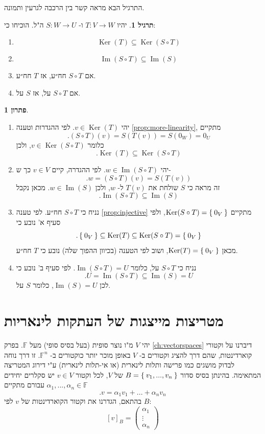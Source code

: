 \documentclass[12pt]{report}
\theoremstyle{plain}
\theoremstyle{definition}
\newtheorem{exercise}{תרגיל}[chapter]
\newtheorem*{solution}{פתרון}
\newcommand{\F}{\mathbb{F}}
\newcommand{\0}{\mathbf{0}}
\DeclareMathOperator{\Ker}{Ker}
\DeclareMathOperator{\Image}{Im}
\begin{document}
התרגיל הבא מראה קשר בין הרכבה לגרעין ותמונה.

\begin{exercise}\label{exer:composition}
יהיו
$T:V\to W$
ו-
$S:W\to U$
ה"ל. הוכיחו כי:
\begin{enumerate}[label=\alph*.]
\item 
$$
\Ker(T)\subseteq \Ker(S\circ T)
$$


\item 
$$
\Image(S\circ T)\subseteq \Image(S)
$$


\item 
אם
$S\circ T$
חח״ע, אז
$T$
חח״ע.


\item 
אם
$S\circ T$
על, אז 
$S$
על.


\end{enumerate}
\end{exercise}

\begin{solution}\
\begin{enumerate}[label=\alph*.]
\item 
יהי
$v\in\Ker(T)$.
לפי ההגדרות וטענה
\ref{prop:more-linearity},
מתקיים
$$
.(S\circ T)(v)=S(T(v))=S(0_W)=0_U
$$
כלומר
$v\in\Ker(S\circ T)$,
ולכן
$$
.\Ker(T)\subseteq \Ker(S\circ T)
$$


\item 
יהי
$w\in\Image(S\circ T)$.
לפי ההגדרה, קיים
$v\in V$
כך ש-
$$
.w=(S\circ T)(v)=S(T(v))
$$
זה מראה כי 
$S$
שולחת את
$T(v)$
ל-
$w$,
ולכן
$w\in\Image(S)$. 
מכאן נקבל
$$
.\Image(S\circ T)\subseteq \Image(S)
$$


\item 
נניח כי
$S\circ T$
חח״ע. לפי טענה
\ref{prop:injective}
מתקיים
$\Ker(S\circ T)=\Set{0_V}$,
ולפי סעיף א' נובע כי
$$
.\Set{0_V}\subseteq \Ker(T)\subseteq \Ker(S\circ T)=\Set{0_V}
$$
מכאן
$\Ker(T)=\Set{0_V}$,
ושוב לפי הטענה (בכיוון ההפוך שלה) נובע כי
$T$
חח״ע.


\item 
נניח כי
$S\circ T$
על, כלומר 
$\Image(S\circ T)=U$.
לפי סעיף ב' נובע כי
$$
.U=\Image(S\circ T)\subseteq \Image(S)=U
$$
לכן
$\Image(S)=U$,
כלומר 
$S$
על.


\end{enumerate}
\end{solution}

\section{מטריצות מייצגות של העתקות לינאריות}
יהי
$V$
מ"ו נוצר סופית (בעל בסיס סופי) מעל 
$\F$.
בפרק
\ref{ch:vectorspaces}
דיברנו על וקטורי קוארדינטות, שהם דרך להציג וקטורים ב-
$V$
באופן מוכר יותר כוקטורים ב-
$\F^n$.
זו דרך נוחה לבדוק מושגים כמו פרישה ותלות לינארית (או אי-תלות לינארית) ע"י דירוג המטריצה המתאימה.
בהינתן בסיס סדור
$B=\Set{v_1,...,v_n}$
של
$V$,
לכל וקטור
$v\in V$
יש סקלרים יחידים
$\alpha_1,...,\alpha_n\in\F$
עבורם מתקיים
$$
.v=\alpha_1 v_1+...+\alpha_n v_n
$$
בהתאם, הגדרנו את וקטור הקוארדינטות של 
$v$
לפי 
$B$:
$$
[v]_B=\begin{pmatrix}\alpha_1\\\vdots\\\alpha_n\end{pmatrix}
$$
\end{document}
